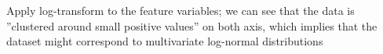 \begin{answer}
Apply log-transform to the feature variables; we can see that the data is ''clustered around small positive values'' on both axis, which implies that the dataset might correspond to multivariate log-normal distributions
\end{answer}
